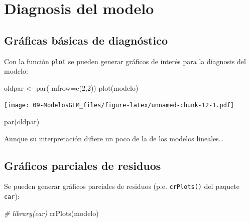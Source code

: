 \documentclass[
]{book}
\newenvironment{Shaded}{\begin{snugshade}}{\end{snugshade}}
\newcommand{\AttributeTok}[1]{\textcolor[rgb]{0.77,0.63,0.00}{#1}}
\newcommand{\CommentTok}[1]{\textcolor[rgb]{0.56,0.35,0.01}{\textit{#1}}}
\newcommand{\DecValTok}[1]{\textcolor[rgb]{0.00,0.00,0.81}{#1}}
\newcommand{\FunctionTok}[1]{\textcolor[rgb]{0.00,0.00,0.00}{#1}}
\newcommand{\NormalTok}[1]{#1}
\newcommand{\OtherTok}[1]{\textcolor[rgb]{0.56,0.35,0.01}{#1}}
\theoremstyle{break}
\theoremstyle{nonumberplain}
\begin{document}
\hypertarget{diagnosis-del-modelo-1}{%
\section{Diagnosis del modelo}\label{diagnosis-del-modelo-1}}

\hypertarget{gruxe1ficas-buxe1sicas-de-diagnuxf3stico-1}{%
\subsection{Gráficas básicas de diagnóstico}\label{gruxe1ficas-buxe1sicas-de-diagnuxf3stico-1}}

Con la función \texttt{plot} se pueden generar gráficos de interés para la diagnosis del modelo:

\begin{Shaded}
\begin{Highlighting}[]
\NormalTok{oldpar }\OtherTok{\textless{}{-}} \FunctionTok{par}\NormalTok{( }\AttributeTok{mfrow=}\FunctionTok{c}\NormalTok{(}\DecValTok{2}\NormalTok{,}\DecValTok{2}\NormalTok{))}
\FunctionTok{plot}\NormalTok{(modelo)}
\end{Highlighting}
\end{Shaded}

\texttt{[image: 09-ModelosGLM\_files/figure-latex/unnamed-chunk-12-1.pdf]}

\begin{Shaded}
\begin{Highlighting}[]
\FunctionTok{par}\NormalTok{(oldpar)}
\end{Highlighting}
\end{Shaded}

Aunque su interpretación difiere un poco de la de los modelos lineales\ldots{}

\hypertarget{gruxe1ficos-parciales-de-residuos-1}{%
\subsection{Gráficos parciales de residuos}\label{gruxe1ficos-parciales-de-residuos-1}}

Se pueden generar gráficos parciales de residuos (p.e. \texttt{crPlots()} del paquete \texttt{car}):

\begin{Shaded}
\begin{Highlighting}[]
\CommentTok{\# library(car)}
\FunctionTok{crPlots}\NormalTok{(modelo)}
\end{Highlighting}
\end{Shaded}
\end{document}
